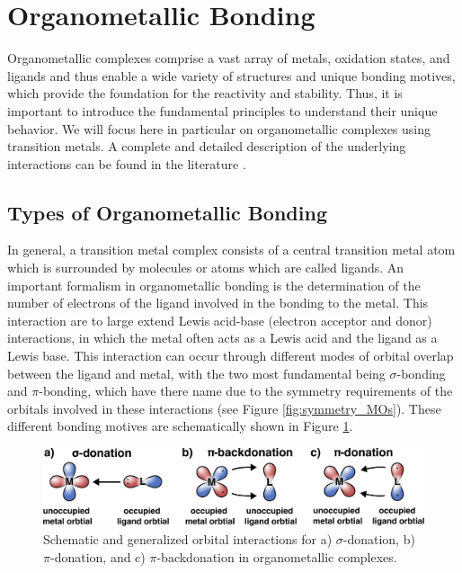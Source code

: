 \section{Organometallic Bonding}
\label{sec:Organometallic_Bonding}
Organometallic complexes comprise a vast array of metals, oxidation states, and ligands and thus enable a wide variety of structures and unique bonding motives, which provide the foundation for the reactivity and stability. Thus, it is important to introduce the fundamental principles to understand their unique behavior. We will focus here in particular on organometallic complexes using transition metals. A complete and detailed description of the underlying interactions can be found in the literature \cite{Hartwig_book, albright2013orbital}.
\subsection{Types of Organometallic Bonding}
\label{subsec:types_organometallic_bonding}
In general, a transition metal complex consists of a central transition metal atom which is surrounded by molecules or atoms which are called ligands. An important formalism in organometallic bonding is the determination of the number of electrons of the ligand involved in the bonding to the metal. This interaction are to large extend Lewis acid-base (electron acceptor and donor) interactions, in which the metal often acts as a Lewis acid and the ligand as a Lewis base. This interaction can occur through different modes of orbital overlap between the ligand and metal, with the two most fundamental being $\sigma$-bonding and $\pi$-bonding, which have there name due to the symmetry requirements of the orbitals involved in these interactions (see Figure \ref{fig:symmetry_MOs}). These different bonding motives are schematically shown in Figure \ref{fig:Bonding_in_metal_complexes}.
\begin{figure}[H]
    \centering
    \includegraphics[width=0.95\linewidth]{Figures/Bonding_in_metal_complexes.pdf}
    \caption{Schematic and generalized orbital interactions for a) $\sigma$-donation, b) $\pi$-donation, and c) $\pi$-backdonation in organometallic complexes.}
    \label{fig:Bonding_in_metal_complexes}
\end{figure}
